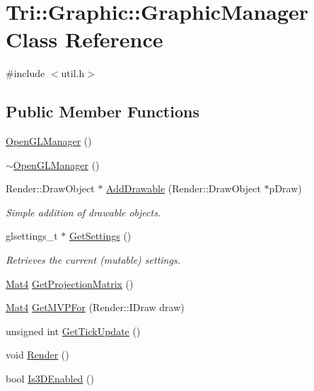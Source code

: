 \hypertarget{class_tri_1_1_graphic_1_1_graphic_manager}{}\section{Tri\+:\+:Graphic\+:\+:Graphic\+Manager Class Reference}
\label{class_tri_1_1_graphic_1_1_graphic_manager}


{\ttfamily \#include $<$util.\+h$>$}

\subsection*{Public Member Functions}
\begin{DoxyCompactItemize}
\item 
\hyperlink{class_tri_1_1_graphic_1_1_graphic_manager_a1c859cd3579ac7f174f41155e9e850e4}{Open\+G\+L\+Manager} ()
\item 
\hyperlink{class_tri_1_1_graphic_1_1_graphic_manager_a472fe570c5cc75942330bf3b4a137d32}{$\sim$\+Open\+G\+L\+Manager} ()
\item 
Render\+::\+Draw\+Object $\ast$ \hyperlink{class_tri_1_1_graphic_1_1_graphic_manager_aab2ac5b4847dcdf9083ab3cc88cbd285}{Add\+Drawable} (Render\+::\+Draw\+Object $\ast$p\+Draw)
\begin{DoxyCompactList}\small\item\em Simple addition of drawable objects. \end{DoxyCompactList}\item 
glsettings\+\_\+t $\ast$ \hyperlink{class_tri_1_1_graphic_1_1_graphic_manager_a3d5a8e96349899110189d6fdb6f07aea}{Get\+Settings} ()
\begin{DoxyCompactList}\small\item\em Retrieves the current (mutable) settings. \end{DoxyCompactList}\item 
\hyperlink{namespace_tri_1_1_graphic_a7b3538cdaff9bf96489c56a4f48a5f9a}{Mat4} \hyperlink{class_tri_1_1_graphic_1_1_graphic_manager_a00d8bb1aec0fe078ebcc66a338eedd3b}{Get\+Projection\+Matrix} ()
\item 
\hyperlink{namespace_tri_1_1_graphic_a7b3538cdaff9bf96489c56a4f48a5f9a}{Mat4} \hyperlink{class_tri_1_1_graphic_1_1_graphic_manager_a127658447d27febc589df6207773f07b}{Get\+M\+V\+P\+For} (Render\+::\+I\+Draw draw)
\item 
unsigned int \hyperlink{class_tri_1_1_graphic_1_1_graphic_manager_ad877d9503a37f69f6406474e08772676}{Get\+Tick\+Update} ()
\item 
void \hyperlink{class_tri_1_1_graphic_1_1_graphic_manager_a63a7dee2163f0bbfd5eb1acd35c1d17f}{Render} ()
\item 
bool \hyperlink{class_tri_1_1_graphic_1_1_graphic_manager_a22a887c39e00775be78981ca95cd9ea6}{Is3\+D\+Enabled} ()
\end{DoxyCompactItemize}


